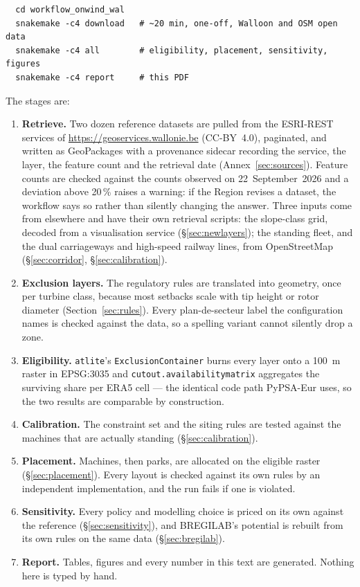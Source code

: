 \documentclass[11pt,a4paper]{article}
\begin{document}
\begin{verbatim}
  cd workflow_onwind_wal
  snakemake -c4 download   # ~20 min, one-off, Walloon and OSM open data
  snakemake -c4 all        # eligibility, placement, sensitivity, figures
  snakemake -c4 report     # this PDF
\end{verbatim}

The stages are:

\begin{enumerate}
  \item \textbf{Retrieve.} Two dozen reference datasets are pulled from the
    ESRI-REST services of \url{https://geoservices.wallonie.be} (CC-BY~4.0),
    paginated, and written as GeoPackages with a provenance sidecar recording
    the service, the layer, the feature count and the retrieval date
    (Annex~\ref{sec:sources}). Feature counts are checked against the counts
    observed on 22~September~2026 and a deviation above 20\,\% raises a warning:
    if the Region revises a dataset, the workflow says so rather than silently
    changing the answer. Three inputs come from elsewhere and have their own
    retrieval scripts: the slope-class grid, decoded from a visualisation
    service (§\ref{sec:newlayers}); the standing fleet, and the dual
    carriageways and high-speed railway lines, from OpenStreetMap
    (§\ref{sec:corridor}, §\ref{sec:calibration}).
  \item \textbf{Exclusion layers.} The regulatory rules are translated into
    geometry, once per turbine class, because most setbacks scale with tip
    height or rotor diameter (Section~\ref{sec:rules}). Every plan-de-secteur
    label the configuration names is checked against the data, so a spelling
    variant cannot silently drop a zone.
  \item \textbf{Eligibility.} \texttt{atlite}'s \texttt{ExclusionContainer}
    burns every layer onto a \SI{100}{\metre} raster in EPSG:3035 and
    \texttt{cutout.availabilitymatrix} aggregates the surviving share per ERA5
    cell --- the identical code path PyPSA-Eur uses, so the two results are
    comparable by construction.
  \item \textbf{Calibration.} The constraint set and the siting rules are tested
    against the machines that are actually standing (§\ref{sec:calibration}).
  \item \textbf{Placement.} Machines, then parks, are allocated on the eligible
    raster (§\ref{sec:placement}). Every layout is checked against its own rules
    by an independent implementation, and the run fails if one is violated.
  \item \textbf{Sensitivity.} Every policy and modelling choice is priced on its
    own against the reference (§\ref{sec:sensitivity}), and BREGILAB's
    potential is rebuilt from its own rules on the same data
    (§\ref{sec:bregilab}).
  \item \textbf{Report.} Tables, figures and every number in this text are
    generated. Nothing here is typed by hand.
\end{enumerate}
\end{document}

